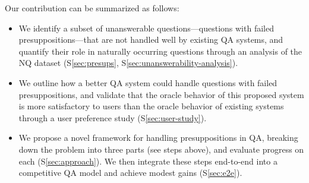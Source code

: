 \documentclass[11pt,a4paper]{article}
\begin{document}
\begin{table*}[t]
    \centering
    \caption{Example causes of unanswerability in NQ. \% denotes the percentage of questions that both annotators agreed to be in the respective cause categories.} 
    \label{table:unanswerableq-analysis}
\end{table*}

\noindent Our contribution can be summarized as follows:

\begin{itemize}
\itemsep -1pt
    \item We identify a subset of unanswerable questions---questions with failed presuppositions---that are not handled well by existing QA systems, and quantify their role in naturally occurring questions through an analysis of the NQ dataset (S\ref{sec:presups},  S\ref{sec:unanswerability-analysis}).
    \item We outline how a better QA system could handle questions with failed presuppositions, and validate that the oracle behavior of this proposed system is more satisfactory to users than the oracle behavior of existing systems through a user preference study (S\ref{sec:user-study}).
    \item We propose a novel framework for handling presuppositions in QA, breaking down the problem into three parts (see steps above), and evaluate progress on each (S\ref{sec:approach}). We then integrate these steps end-to-end into a competitive QA model and achieve modest gains (S\ref{sec:e2e}).
\end{itemize}
\end{document}
